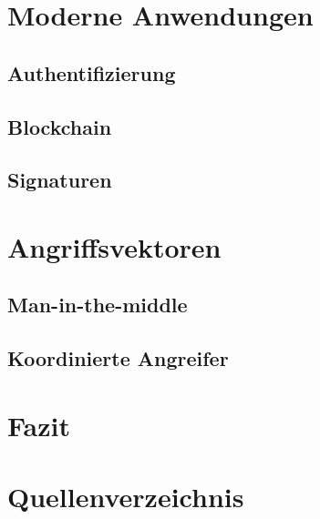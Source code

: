 \documentclass {article}
\begin{document}
\section{Moderne Anwendungen}
\subsection{Authentifizierung}
\subsection{Blockchain}
\subsection{Signaturen}
\section{Angriffsvektoren}
\subsection{Man-in-the-middle}
\subsection{Koordinierte Angreifer}
\section{Fazit}

\newpage
\section{Quellenverzeichnis}

\nocite{BG89}
\nocite{BM89}
\nocite{GMR85}
\nocite{GO94}
\nocite{KZKP}
\nocite{PrSa14}
\nocite{RS91}
\nocite{BHHW}

\printbibliography


  
\end{document}
